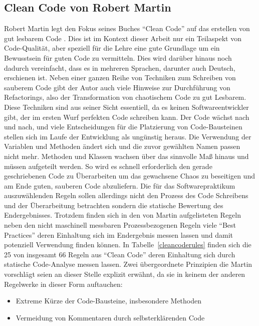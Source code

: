 \documentclass[da,ngerman]{stthesis}
\begin{document}
			\subsection{Clean Code von Robert Martin} \label{cleancodechapter}
				Robert Martin legt den Fokus seines Buches "`Clean Code"' auf das erstellen von gut lesbarem Code \cite{CleanCode}. Dies ist im Kontext dieser Arbeit nur ein Teilaspekt von Code-Qualität, aber speziell für die Lehre eine gute Grundlage um ein Bewusstsein für guten Code zu vermitteln. Dies wird darüber hinaus noch dadurch vereinfacht, dass es in mehreren Sprachen, darunter auch Deutsch, erschienen ist. \newline
				Neben einer ganzen Reihe von Techniken zum Schreiben von sauberem Code gibt der Autor auch viele Hinweise zur Durchführung von Refactorings, also der Transformation von chaotischem Code zu gut Lesbarem. Diese Techniken sind aus seiner Sicht essentiell, da es keinen Softwareentwickler gibt, der im ersten Wurf perfekten Code schreiben kann. Der Code wächst nach und nach, und viele Entscheidungen für die Platzierung von Code-Bausteinen stellen sich im Laufe der Entwicklung als ungünstig heraus. Die Verwendung der Variablen und Methoden ändert sich und die zuvor gewählten Namen passen nicht mehr. Methoden und Klassen wachsen über das sinnvolle Maß hinaus und müssen aufgeteilt werden. So wird es schnell erforderlich den gerade geschriebenen Code zu Überarbeiten um das gewachsene Chaos zu beseitigen und am Ende guten, sauberen Code abzuliefern. \newline
				Die für das Softwarepraktikum auszuwählenden Regeln sollen allerdings nicht den Prozess des Code Schreibens und der Überarbeitung betrachten sondern die statische Bewertung des Endergebnisses. Trotzdem finden sich in den von Martin aufgelisteten Regeln neben den nicht maschinell messbaren Prozessbezogenen Regeln viele "`Best Practices"' deren Einhaltung sich im Endergebnis messen lassen und damit potenziell Verwendung finden können. In Tabelle~\ref{cleancoderules} finden sich die 25 von insgesamt 66 Regeln aus "`Clean Code"' deren Einhaltung sich durch statische Code-Analyse messen lassen. \newline
				Zwei übergeordnete Prinzipien die Martin vorschlägt seien an dieser Stelle explizit erwähnt, da sie in keinem der anderen Regelwerke in dieser Form auftauchen:
				\begin{itemize}
					\item Extreme Kürze der Code-Bausteine, insbesondere Methoden  
					\item Vermeidung von Kommentaren durch selbsterklärenden Code
				\end{itemize}
\end{document}
